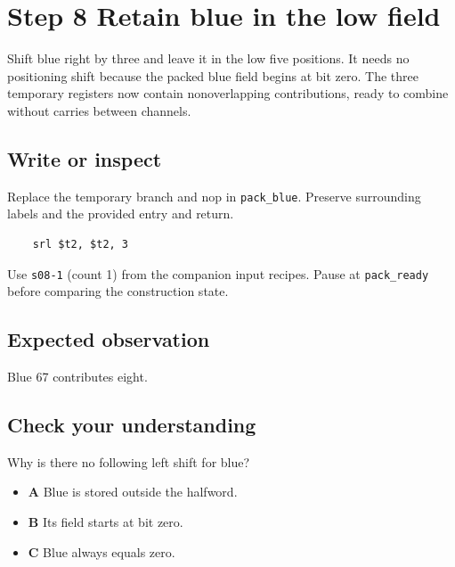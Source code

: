 \section{Step 8 Retain blue in the low field}\label{rgb-s08}

Shift blue right by three and leave it in the low five positions. It needs no positioning shift because the packed blue field begins at bit zero. The three temporary registers now contain nonoverlapping contributions, ready to combine without carries between channels.

\subsection{Write or inspect}
Replace the temporary branch and nop in \texttt{pack\_blue}. Preserve surrounding labels and the provided entry and return.

\begin{verbatim}
    srl $t2, $t2, 3
\end{verbatim}
Use \texttt{s08-1} (count 1) from the companion input recipes. Pause at \texttt{pack\_ready} before comparing the construction state.

\subsection{Expected observation}
Blue 67 contributes eight.

\subsection{Check your understanding}
Why is there no following left shift for blue?

\begin{itemize}
  \item \textbf{A} Blue is stored outside the halfword.
  \item \textbf{B} Its field starts at bit zero.
  \item \textbf{C} Blue always equals zero.
\end{itemize}
